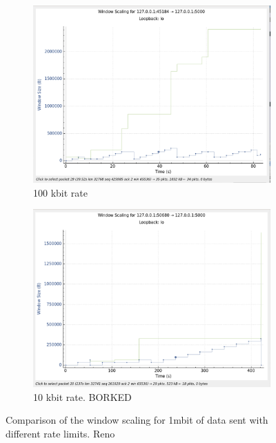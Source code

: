 \documentclass{report}
\begin{document}
\begin{figure}[H]
    \begin{subfigure}[b]{0.45\textwidth}
        \centering
        \includegraphics[width=\textwidth]{Pics/Reno/r100kbit_s1m_ws}
        \caption{100 kbit rate}
    \end{subfigure}
    \hfill
    \begin{subfigure}[b]{0.45\textwidth}
        \centering
        \includegraphics[width=\textwidth]{Pics/Reno/r10kbit_s1m_ws}
        \caption{10 kbit rate. BORKED}
    \end{subfigure}
    \caption{Comparison of the window scaling for 1mbit of data sent with different rate limits. Reno}
    \label{fig:four_images}
\end{figure}
\end{document}
